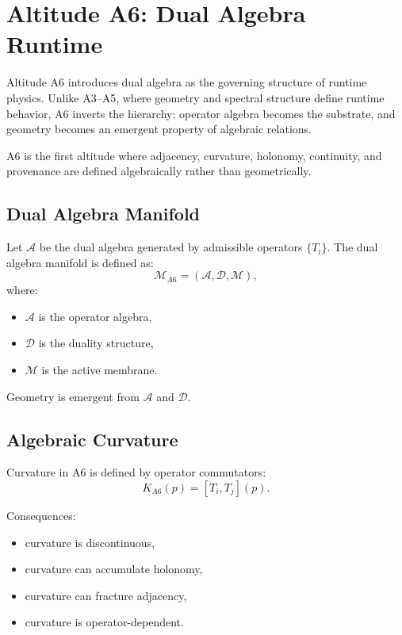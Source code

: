 
\section{Altitude A6: Dual Algebra Runtime}

Altitude A6 introduces dual algebra as the governing structure of runtime
physics. Unlike A3–A5, where geometry and spectral structure define runtime
behavior, A6 inverts the hierarchy: operator algebra becomes the substrate, and
geometry becomes an emergent property of algebraic relations.

A6 is the first altitude where adjacency, curvature, holonomy, continuity, and
provenance are defined algebraically rather than geometrically.

\subsection{Dual Algebra Manifold}

Let $\mathcal{A}$ be the dual algebra generated by admissible operators
$\{T_i\}$. The dual algebra manifold is defined as:
\[
\mathcal{M}_{A6} = (\mathcal{A}, \mathcal{D}, \mathcal{M}),
\]
where:
\begin{itemize}
  \item $\mathcal{A}$ is the operator algebra,
  \item $\mathcal{D}$ is the duality structure,
  \item $\mathcal{M}$ is the active membrane.
\end{itemize}

Geometry is emergent from $\mathcal{A}$ and $\mathcal{D}$.

\subsection{Algebraic Curvature}

Curvature in A6 is defined by operator commutators:
\[
K_{A6}(p) = [T_i, T_j](p).
\]

Consequences:
\begin{itemize}
  \item curvature is discontinuous,
  \item curvature can accumulate holonomy,
  \item curvature can fracture adjacency,
  \item curvature is operator-dependent.
\end{itemize}

